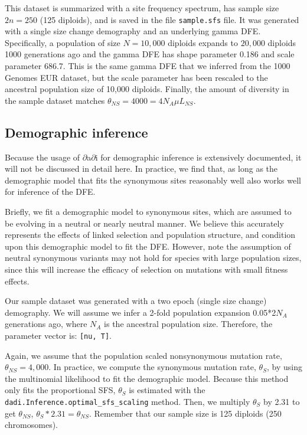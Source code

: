 \documentclass[12pt]{article}
\begin{document}
This dataset is summarized with a site frequency spectrum, has sample size $2n=250$ (125 diploids), and is saved in the file \texttt{sample.sfs} file. It was generated with a single size change demography and an underlying gamma DFE. Specifically, a population of size $N=10,000$ diploids expands to $20,000$ diploids 1000 generations ago and the gamma DFE has shape parameter 0.186 and scale parameter 686.7. This is the same gamma DFE that we inferred from the 1000 Genomes EUR dataset, but the scale parameter has been rescaled to the ancestral population size of 10,000 diploids. Finally, the amount of diversity in the sample dataset matches $\theta_{NS}=4000=4N_A \mu L_{NS}$.

\subsection{Demographic inference}

Because the usage of $\partial$a$\partial$i for demographic inference is extensively documented, it will not be discussed in detail here. In practice, we find that, as long as the demographic model that fits the synonymous sites reasonably well also works well for inference of the DFE.  

Briefly, we fit a demographic model to synonymous sites, which are assumed to be evolving in a neutral or nearly neutral manner. We believe this accurately represents the effects of linked selection and population structure, and condition upon this demographic model to fit the DFE. However, note the assumption of neutral synonymous variants may not hold for species with large population sizes, since this will increase the efficacy of selection on mutations with small fitness effects.

Our sample dataset was generated with a two epoch (single size change) demography. We will assume we infer a 2-fold population expansion 0.05*2$N_A$ generations ago, where $N_A$ is the ancestral population size. Therefore, the parameter vector is: \texttt{[nu, T]}.



Again, we assume that the population scaled nonsynonymous mutation rate, $\theta_{NS}=4,000$. In practice, we compute the synonymous mutation rate, $\theta_S$, by using the multinomial likelihood to fit the demographic model. Because this method only fits the proportional SFS, $\theta_S$ is estimated with the \texttt{dadi.Inference.optimal\_sfs\_scaling} method. Then, we multiply $\theta_S$ by 2.31 to get $\theta_{NS}$, $\theta_S * 2.31 = \theta_{NS}$. Remember that our sample size is 125 diploids (250 chromosomes).
\end{document}
